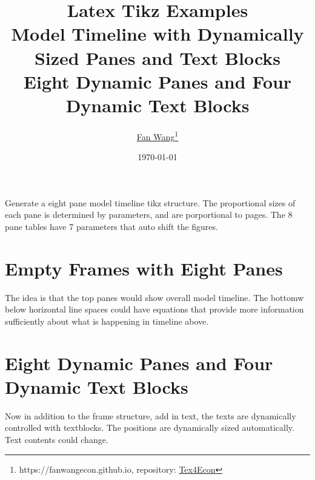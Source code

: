 \documentclass{article}
\title{Latex Tikz Examples\\Model Timeline with Dynamically Sized Panes and Text Blocks \\ Eight Dynamic Panes and Four Dynamic Text Blocks}
\author{\href{https://fanwangecon.github.io/}{Fan Wang}\thanks{https://fanwangecon.github.io, repository: \href{https://fanwangecon.github.io/Tex4Econ/}{Tex4Econ}}}
\date{\today}
\newcommand{\tikzframeeight}[7]{

  \def\fgiw{#1*\textwidth*#7}
  \def\fgih{#2*\textheight*#7}

  \def\fgiwm{#3*\fgiw}
  \def\fgihm{#4*\fgih}

  \def\fgile{#5*\fgiw}
  \def\fgire{#6*\fgiw}

  \def\fgiwlm{\fgile*0.5 + \fgiwm*0.5}
  \def\fgiwrm{\fgiwm*0.5 + \fgire*0.5}

  \def\fgihtb{\fgihm + \fgih*0.085 - \fgihm*0.085}

  \def\fgihtm{\fgihm*0.5 + \fgih*0.5}
  \def\fgihbm{\fgihm*0.5}



  \draw [dotted] (0, \fgih) -- (\fgiw, \fgih);
  \draw [dotted] (0, 0    ) -- (\fgiw, 0    );

  \draw [dotted] (0,     0) -- (0,     \fgih);
  \draw [dotted] (\fgiw, 0) -- (\fgiw, \fgih);

  \draw [dotted] (\fgiwm, 0) -- (\fgiwm,   \fgih);
  \draw [solid] (0, \fgihm) -- (\fgiw,   \fgihm);

  \draw[dashed] (\fgile, 0  ) -- (\fgile,   \fgih);
  \draw[dashed] (\fgire, 0  ) -- (\fgire,   \fgih);

  \node[align=center] at (0.5*\fgile,             0.900*\fgih) {last\\period};
  \node[align=center] at (0.5*\fgiw,              0.900*\fgih) {current period};
  \node[align=center] at (0.5*\fgire + 0.5*\fgiw, 0.900*\fgih) {next\\period};

  \node[align=center] at (\fgiwlm, \fgihtb) {shocks};
  \node[align=center] at (\fgiwrm, \fgihtb) {asset choices};

  \draw [->, line width=0.25mm] (\fgile-0.2*\fgile, \fgihtm) -- (\fgile+0.2*\fgile, \fgihtm);
  \draw [->, line width=0.25mm] (\fgiwm-0.2*\fgile, \fgihtm) -- (\fgiwm+0.2*\fgile, \fgihtm);
  \draw [->, line width=0.25mm] (\fgire-0.2*\fgile, \fgihtm) -- (\fgire+0.2*\fgile, \fgihtm);
}
\begin{document}
\maketitle

Generate a eight pane model timeline tikz structure. The proportional sizes of each pane is determined by parameters, and are porportional to pages. The 8 pane tables have 7 parameters that auto shift the figures.


\section{Empty Frames with Eight Panes}
The idea is that the top panes would show overall model timeline. The bottomw below horizontal line spaces could have equations that provide more information sufficiently about what is happening in timeline above.
\begin{center}
\end{center}
\begin{center}
\end{center}
\begin{center}
\end{center}
\pagebreak

\section{Eight Dynamic Panes and Four Dynamic Text Blocks}

Now in addition to the frame structure, add in text, the texts are dynamically controlled with textblocks. The positions are dynamically sized automatically. Text contents could change.
\end{document}
